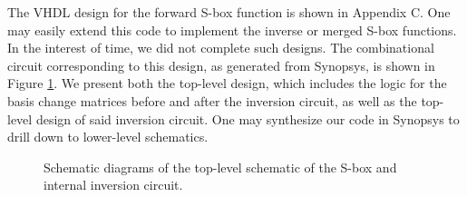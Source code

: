 \newpage
The VHDL design for the forward S-box function is shown in Appendix C. One may easily extend this code to implement the inverse or merged S-box functions. In the interest of time, we did not complete such designs. The combinational circuit corresponding to this design, as generated from Synopsys, is shown in Figure \ref{fig:aesAltCircuit}. We present both the top-level design, which includes the logic for the basis change matrices before and after the inversion circuit, as well as the top-level design of said inversion circuit. One may synthesize our code in Synopsys to drill down to lower-level schematics. 

\begin{landscape}
\thispagestyle{empty}
\begin{figure}[ht]
\centering
{}
\caption{Schematic diagrams of the top-level schematic of the S-box and internal inversion circuit.}
\label{fig:aesAltCircuit}
\end{figure}
\end{landscape}

